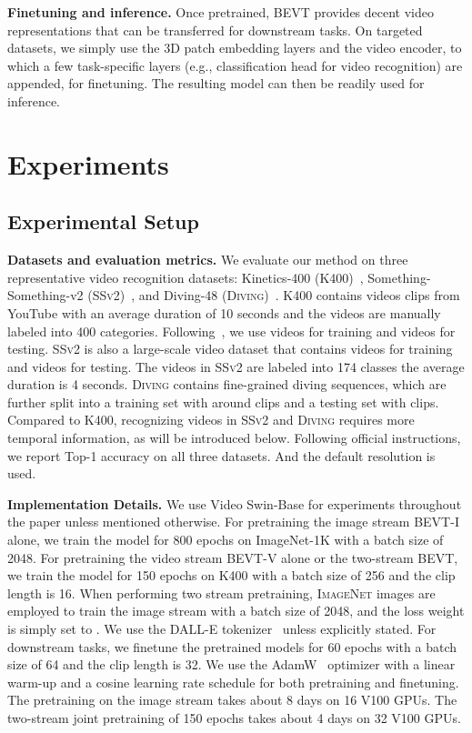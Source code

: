 \documentclass[10pt,twocolumn,letterpaper]{article}
\makeatletter
\newcommand*{\system}{BEVT\@\xspace}
\newcommand{\ssv}{{\scshape SSv2}\xspace}
\newcommand{\diving}{{\scshape Diving\-48}\xspace}
\newcommand{\kn}{{\scshape K400}\xspace}
\newcommand{\inet}{{\scshape ImageNet}\xspace}
\makeatother
\begin{document}
\vspace{0.05in}
\noindent\textbf{Finetuning and inference.} Once pretrained, \system provides decent video representations that can be transferred for downstream tasks. On targeted datasets, we simply use the 3D patch embedding layers and the video encoder, to which a few task-specific layers (e.g., classification head for video recognition) are appended, for finetuning. The resulting model can then be readily used for inference.

\section{Experiments}
\subsection{Experimental Setup}
\noindent\textbf{Datasets and evaluation metrics.} We evaluate our method on three representative video recognition datasets: Kinetics-400 (\kn)~\cite{quovadis}, Something-Something-v2 (\ssv)~\cite{ssv2}, and Diving-48 (\diving)~\cite{resound}. \kn contains videos clips from YouTube with an average duration of 10 seconds and the videos are manually labeled  into 400 categories. Following~\cite{slowfast}, we use  videos for training and  videos for testing. \ssv is also a large-scale video dataset that contains  videos for training and  videos for testing. The videos in \ssv are labeled into 174 classes the average duration is 4 seconds. \diving contains  fine-grained diving sequences, which are further split into a training set with around  clips and a testing set with  clips. Compared to \kn, recognizing videos in \ssv and \diving requires more temporal information, as will be introduced below. Following official instructions, we report Top-1 accuracy on all three datasets. And the default resolution  is used.

\vspace{0.05in}
\noindent\textbf{Implementation Details.} We use Video Swin-Base for experiments throughout the paper unless mentioned otherwise. For pretraining the image stream \system-I alone, we train the model for 800 epochs on  ImageNet-1K with a batch size of 2048. For pretraining the video stream \system-V alone or the two-stream \system, we train the model for 150 epochs on \kn with a batch size of 256 and the clip length  is 16. When performing two stream pretraining, \inet images are employed to train the image stream with a batch size of 2048, and the loss weight  is simply set to . We use the DALL-E tokenizer~\cite{dalle} unless explicitly stated. For downstream tasks, we finetune the pretrained models for 60 epochs with a batch size of 64 and the clip length is 32. We use the AdamW~\cite{loshchilov2018decoupled} optimizer with a linear warm-up and a cosine learning rate schedule for both pretraining and finetuning. The pretraining on the image stream takes about 8 days on 16 V100 GPUs. The two-stream joint pretraining of 150 epochs takes about 4 days on 32 V100 GPUs. 
\end{document}
